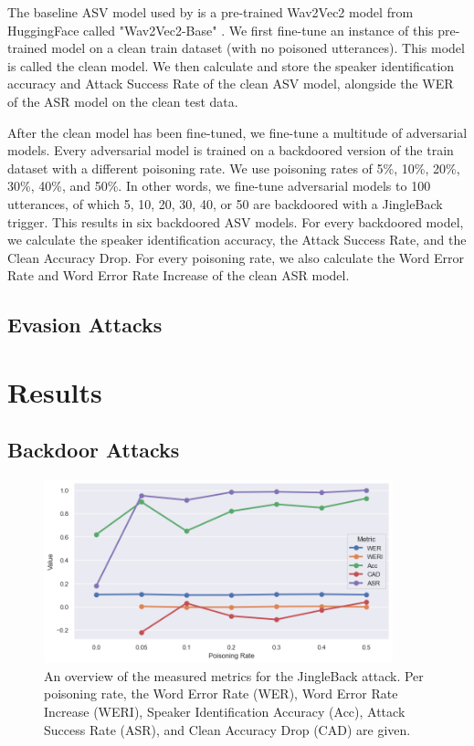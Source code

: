 \documentclass[11pt]{article}
\begin{document}
The baseline ASV model used by \citeauthor{roddeman2024anonymization} is a pre-trained Wav2Vec2 model \citep{baevski2020wav2vec2} from HuggingFace called "Wav2Vec2-Base" \citep{facebook2021huggingface}.
We first fine-tune an instance of this pre-trained model on a clean train dataset (with no poisoned utterances).
This model is called the clean model.
We then calculate and store the speaker identification accuracy and Attack Success Rate of the clean ASV model, alongside the WER of the ASR model on the clean test data.

After the clean model has been fine-tuned, we fine-tune a multitude of adversarial models.
Every adversarial model is trained on a backdoored version of the train dataset with a different poisoning rate.
We use poisoning rates of 5\%, 10\%, 20\%, 30\%, 40\%, and 50\%.
In other words, we fine-tune adversarial models to 100 utterances, of which 5, 10, 20, 30, 40, or 50 are backdoored with a JingleBack trigger.
This results in six backdoored ASV models.
For every backdoored model, we calculate the speaker identification accuracy, the Attack Success Rate, and the Clean Accuracy Drop.
For every poisoning rate, we also calculate the Word Error Rate and Word Error Rate Increase of the clean ASR model.

\subsection{Evasion Attacks}
\citet{kim2020torchattacks}

\section{Results}
\subsection{Backdoor Attacks}
\begin{figure}
    \centering
    \includegraphics[width=0.9\textwidth]{backdoor_metrics.png}
    \caption{An overview of the measured metrics for the JingleBack attack. Per poisoning rate, the Word Error Rate (WER), Word Error Rate Increase (WERI), Speaker Identification Accuracy (Acc), Attack Success Rate (ASR), and Clean Accuracy Drop (CAD) are given.}
    \label{fig:backdoor_metrics}
\end{figure}
\end{document}
